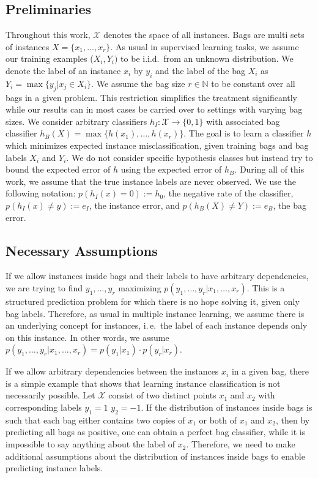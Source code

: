 \subsection{Preliminaries}
Throughout this work, $\mathcal{X}$ denotes the space of all instances. Bags are multi sets of instances $X=\{x_1,\dotsc, x_r\}$.
As usual in supervised learning tasks, we assume our training examples ($X_i,Y_i)$ to be i.i.d.\ from an unknown distribution.
We denote the label of an instance $x_i$ by $y_i$ and the label of the bag $X_i$ as $Y_i = \max\{y_j | x_j \in  X_i\}$.
We assume the bag size $r\in \mathbb{N}$ to be constant over all bags in a given problem. This restriction simplifies the treatment
significantly while our results can in most cases be carried over to settings with varying bag sizes.
We consider arbitrary classifiers $h_I\colon \mathcal{X} \rightarrow \{0, 1\}$ with associated bag classifier
$h_B(X) = \max \{h(x_1),\dotsc,h(x_r)\}$.
The goal is to learn a classifier $h$ which minimizes expected instance misclassification, given training bags and bag labels
$X_i$ and $Y_i$.
We do not consider specific hypothesis classes but instead try to bound the expected error of $h$ using the expected error of $h_B$.
During all of this work, we assume that the true instance labels are never observed.
We use the following notation: $p(h_I(x)=0):= h_0$, the negative rate of the classifier,
$p(h_I(x) \neq y) := e_I$, the instance error, and $p(h_B(X) \neq Y) := e_B$, the bag error.

\subsection{Necessary Assumptions}
If we allow instances inside bags and their labels to have arbitrary dependencies, we are trying to find
$y_1,\dotsc,y_r$ maximizing $p(y_1,\dotsc, y_r | x_1, \dotsc, x_r)$. This is a structured 
prediction problem for which there is no hope solving it, given only bag labels.
Therefore, as usual in multiple instance learning, we assume there is an underlying concept for instances,
i.\,e.\ the label of each instance depends only on this instance.
In other words, we assume $p(y_1,\dotsc, y_r | x_1, \dotsc, x_r)=p(y_1|x_1) \cdot p(y_r|x_r)$.

If we allow arbitrary dependencies between the instances $x_i$ in a given bag, there is a simple example 
\citep{sabato2009homogeneous} that shows that learning instance classification is not necessarily possible.
Let $\mathcal{X}$ consist of two
distinct points $x_1$ and $x_2$ with corresponding labels $y_1 = 1$ $y_2 = -1$. If the distribution
of instances inside bags is such that each bag either contains two copies of $x_1$ or both of $x_1$ and $x_2$, then
by predicting all bags as positive, one can obtain a perfect bag classifier, while it is impossible to say anything
about the label of $x_2$.
Therefore, we need to make additional assumptions about the distribution of instances inside bags to enable
predicting instance labels.

